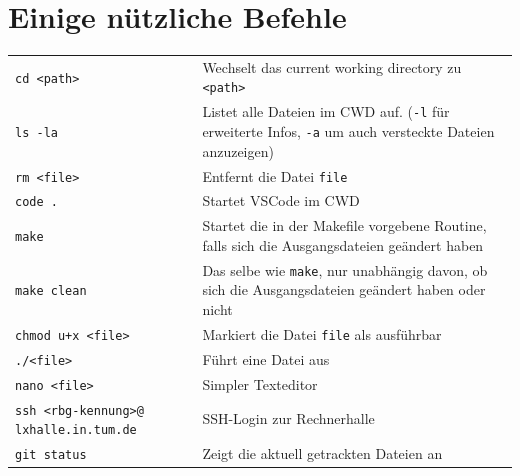 \documentclass{article}
\begin{document}
\section{Einige nützliche Befehle}
\begin{longtable}{p{4cm}p{12cm}}
	\verb|cd <path>|                                     & Wechselt das current working directory zu \verb|<path>|                                                           \\
	\verb|ls -la|                                        & Listet alle Dateien im CWD auf. (\verb|-l| für erweiterte Infos, \verb|-a| um auch versteckte Dateien anzuzeigen) \\
	\verb|rm <file>|                                     & Entfernt die Datei \verb|file|                                                                                    \\
	\verb|code .|                                        & Startet VSCode im CWD                                                                                             \\
	\verb|make|                                          & Startet die in der Makefile vorgebene Routine, falls sich die Ausgangsdateien geändert haben                      \\
	\verb|make clean|                                    & Das selbe wie \verb|make|, nur unabhängig davon, ob sich die Ausgangsdateien geändert haben oder nicht            \\
	\verb|chmod u+x <file>|                              & Markiert die Datei \verb|file| als ausführbar                                                                     \\
	\verb|./<file>|                                      & Führt eine Datei aus                                                                                              \\
	\verb|nano <file>|                                   & Simpler Texteditor                                                                                                \\
	\verb|ssh <rbg-kennung>@| \verb|lxhalle.in.tum.de|   & SSH-Login zur Rechnerhalle                                                                                        \\
	\verb|git status|                                    & Zeigt die aktuell getrackten Dateien an                                                                           \\

\end{longtable}
\end{document}
